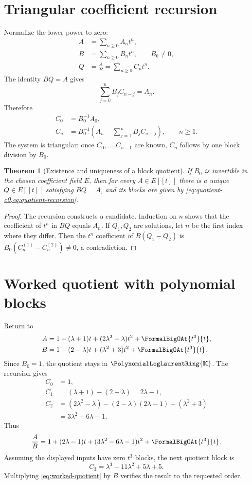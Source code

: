 \documentclass[11pt,openany]{book}
\theoremstyle{definition}
\theoremstyle{plain}
\newtheorem{theorem}{Theorem}[chapter]
\theoremstyle{remark}
\newcommand{\K}{\mathbb{K}}
\newcommand{\Plog}{\PolynomialLogLaurentRing{\K}}
\begin{document}
\section{Triangular coefficient recursion}
Normalize the lower power to zero:
\begin{align*}
 A&=\sum_{n\ge0}A_n t^n,\\
 B&=\sum_{n\ge0}B_n t^n,\qquad B_0\ne0,\\
 Q&=\frac AB=\sum_{n\ge0}C_n t^n.
\end{align*}
The identity \(BQ=A\) gives
\[
 \sum_{j=0}^{n}B_jC_{n-j}=A_n.
\]
Therefore
\begin{align}
 C_0&=B_0^{-1}A_0,\label{eq:quotient-c0}\\
 C_n&=B_0^{-1}
 \left(A_n-\sum_{j=1}^{n}B_jC_{n-j}\right),
 \qquad n\ge1.\label{eq:quotient-recursion}
\end{align}
The system is triangular: once \(C_0,\ldots,C_{n-1}\) are known, \(C_n\) follows by one block division by \(B_0\).

\begin{theorem}[Existence and uniqueness of a block quotient]\label{thm:block-quotient}
If \(B_0\) is invertible in the chosen coefficient field \(E\), then for every \(A\in E[[t]]\) there is a unique \(Q\in E[[t]]\) satisfying \(BQ=A\), and its blocks are given by \cref{eq:quotient-c0,eq:quotient-recursion}.
\end{theorem}

\begin{proof}
The recursion constructs a candidate. Induction on \(n\) shows that the coefficient of \(t^n\) in \(BQ\) equals \(A_n\). If \(Q_1,Q_2\) are solutions, let \(n\) be the first index where they differ. Then the \(t^n\) coefficient of \(B(Q_1-Q_2)\) is \(B_0(C_n^{(1)}-C_n^{(2)})\ne0\), a contradiction.
\end{proof}

\section{Worked quotient with polynomial blocks}
Return to
\begin{align*}
 A&=1+(\lambda+1)t+(2\lambda^2-\lambda)t^2+\FormalBigOAt{t^3}{t},\\
 B&=1+(2-\lambda)t+(\lambda^2+3)t^2+\FormalBigOAt{t^3}{t}.
\end{align*}
Since \(B_0=1\), the quotient stays in \(\Plog\). The recursion gives
\begin{align*}
 C_0&=1,\\
 C_1&=(\lambda+1)-(2-\lambda)=2\lambda-1,\\
 C_2&=(2\lambda^2-\lambda)
 -(2-\lambda)(2\lambda-1)-(\lambda^2+3)\\
 &=3\lambda^2-6\lambda-1.
\end{align*}
Thus
\begin{equation}\label{eq:worked-quotient}
 \frac AB
 =1+(2\lambda-1)t+(3\lambda^2-6\lambda-1)t^2+\FormalBigOAt{t^3}{t}.
\end{equation}
Assuming the displayed inputs have zero \(t^3\) blocks, the next quotient block is
\[
 C_3=\lambda^3-11\lambda^2+5\lambda+5.
\]
Multiplying \cref{eq:worked-quotient} by \(B\) verifies the result to the requested order.
\end{document}
